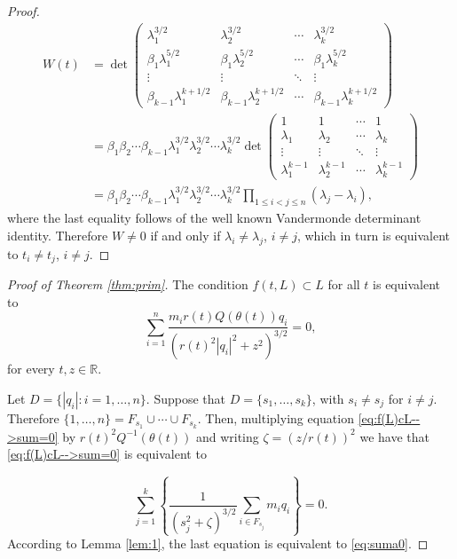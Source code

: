 \documentclass[twoside]{article}
\theoremstyle{remark}
\newcommand{\rr}{\mathbb{R}}
\begin{document}
\begin{proof}
\[
\begin{split}
  W(t)&=\det
    \begin{pmatrix}
      \lambda_1^{3/2} & \lambda_2^{3/2} &\cdots & \lambda_k^{3/2} \\
      \beta_1\lambda_1^{5/2} &\beta_1 \lambda_2^{5/2} &\cdots &\beta_1 \lambda_k^{5/2}\\
      \vdots & \vdots &\ddots & \vdots\\
      \beta_{k-1}\lambda_1^{k+1/2} & \beta_{k-1}\lambda_2^{k+1/2} &\cdots & \beta_{k-1}\lambda_k^{k+1/2}
    \end{pmatrix}
  \\
  &= \beta_1\beta_2\cdots\beta_{k-1} \lambda_1^{3/2}\lambda_2^{3/2}\cdots \lambda_k^{3/2}
     \det \begin{pmatrix}
      1& 1 &\cdots & 1 \\
      \lambda_1 & \lambda_2 &\cdots & \lambda_k\\
      \vdots & \vdots &\ddots & \vdots\\
      \lambda_1^{k-1} & \lambda_2^{k-1} &\cdots & \lambda_k^{k-1}
    \end{pmatrix}
  \\
  &= \beta_1\beta_2\cdots\beta_{k-1} \lambda_1^{3/2}\lambda_2^{3/2}\cdots \lambda_k^{3/2}
  \prod_{1\leq i<j\leq n}(\lambda_j-\lambda_i)
,
\end{split}
\]
where the last equality follows of the well known Vandermonde determinant identity. Therefore $W\neq 0$ if and only if $\lambda_i\neq\lambda_j$, $i\neq j$,
which in turn is equivalent to $t_i\neq t_j$, $i\neq j$.
\end{proof}








\begin{proof}[Proof of Theorem \ref{thm:prim}]
The condition $f(t,L)\subset L$ for all $t$ is equivalent to
\begin{equation}\label{eq:f(L)cL-->sum=0}
 \sum_{i=1}^n\frac{m_ir(t)Q(\theta (t))q_i}{\left(r(t)^2|q_i|^2+z^2\right)^{3/2}}=0,
\end{equation}
for every $t,z\in \rr$.

Let $D=\{|q_i|: i=1,\ldots,n\}$.  Suppose that $D=\{s_1,\ldots,s_k\}$, with $s_i\neq s_j$ for $i\neq j$.  Therefore $\{1,\ldots,n\}=F_{s_1}\cup \cdots\cup F_{s_k}$. Then, multiplying equation \eqref{eq:f(L)cL-->sum=0} by $r(t)^2Q^{-1}(\theta(t))$  and writing $\zeta=(z/r(t))^2$ we have that \eqref{eq:f(L)cL-->sum=0} is equivalent to


\[\sum_{j=1}^k\left\{\frac{1}{(s_j^{2}+\zeta)^{3/2}}\sum_{i\in F_{s_j}}m_iq_i\right\}=0.\]
According to Lemma \ref{lem:1}, the last equation is equivalent to \eqref{eq:suma0}.
\end{proof}
\end{document}
